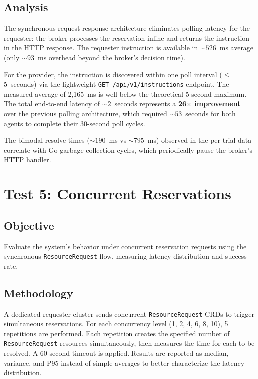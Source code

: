 \subsection{Analysis}

The synchronous request-response architecture eliminates polling latency for the requester: the broker processes the reservation inline and returns the instruction in the HTTP response. The requester instruction is available in ${\sim}526$~ms average (only ${\sim}93$~ms overhead beyond the broker's decision time).

For the provider, the instruction is discovered within one poll interval ($\leq$5~seconds) via the lightweight \texttt{GET /api/v1/instructions} endpoint. The measured average of 2,165~ms is well below the theoretical 5-second maximum. The total end-to-end latency of ${\sim}2$~seconds represents a \textbf{26$\times$ improvement} over the previous polling architecture, which required ${\sim}53$~seconds for both agents to complete their 30-second poll cycles.

The bimodal resolve times (${\sim}190$~ms vs ${\sim}795$~ms) observed in the per-trial data correlate with Go garbage collection cycles, which periodically pause the broker's HTTP handler.


\section{Test 5: Concurrent Reservations}
\label{sec:test5}

\subsection{Objective}

Evaluate the system's behavior under concurrent reservation requests using the synchronous \texttt{ResourceRequest} flow, measuring latency distribution and success rate.

\subsection{Methodology}

A dedicated requester cluster sends concurrent \texttt{ResourceRequest} CRDs to trigger simultaneous reservations. For each concurrency level (1, 2, 4, 6, 8, 10), 5 repetitions are performed. Each repetition creates the specified number of \texttt{ResourceRequest} resources simultaneously, then measures the time for each to be resolved. A 60-second timeout is applied. Results are reported as median, variance, and P95 instead of simple averages to better characterize the latency distribution.

